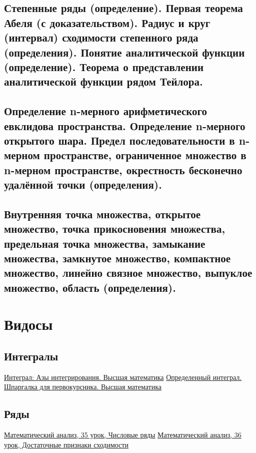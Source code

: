 \documentclass[11pt]{article}
\begin{document}
\subsection{Степенные ряды (определение). Первая теорема Абеля (с доказательством). Радиус и круг (интервал) сходимости степенного ряда (определения). Понятие аналитической функции (определение). Теорема о представлении аналитической функции рядом Тейлора.}
\label{sec:org1a03391}

\subsection{Определение n-мерного арифметического евклидова пространства. Определение n-мерного открытого шара. Предел последовательности в n-мерном пространстве, ограниченное множество  в n-мерном пространстве, окрестность бесконечно удалённой точки (определения).}
\label{sec:org29ce0a9}

\subsection{Внутренняя точка множества, открытое множество, точка прикосновения множества, предельная точка множества, замыкание множества, замкнутое множество, компактное множество, линейно связное множество, выпуклое множество, область (определения).}
\label{sec:org02569a3}
\section{Видосы}
\label{sec:org2f8475a}
\subsection{Интегралы}
\label{sec:orgf2f4361}
\href{https://www.youtube.com/watch?v=nCx6FTChgow}{Интеграл: Азы интегрирования. Высшая математика}
\href{https://www.youtube.com/watch?v=wEmtlqJy2MM}{
Определенный интеграл. Шпаргалка для первокурсника. Высшая математика}
\subsection{Ряды}
\label{sec:org6f9de9b}
\href{https://www.youtube.com/watch?v=XcofHzGx9Ug}{Математический анализ, 35 урок, Числовые ряды}
\href{https://www.youtube.com/watch?v=uq78fpEas5I}{
Математический анализ, 36 урок, Достаточные признаки сходимости}
\end{document}

